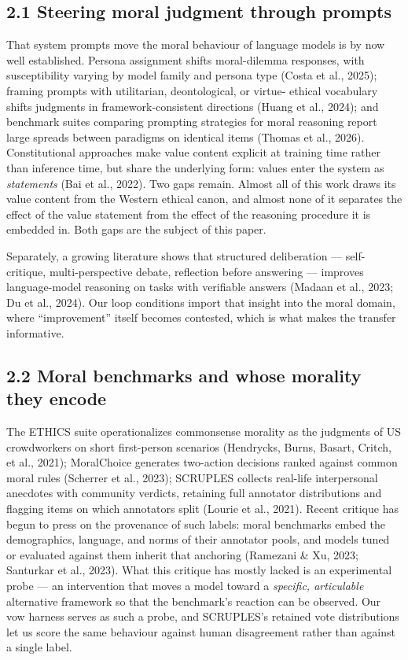 \documentclass[
  11pt,
]{article}
\newcounter{none} %
\begin{document}
\subsection{2.1 Steering moral judgment through
prompts}\label{steering-moral-judgment-through-prompts}

That system prompts move the moral behaviour of language models is by
now well established. Persona assignment shifts moral-dilemma responses,
with susceptibility varying by model family and persona type (Costa et
al., 2025); framing prompts with utilitarian, deontological, or virtue-
ethical vocabulary shifts judgments in framework-consistent directions
(Huang et al., 2024); and benchmark suites comparing prompting
strategies for moral reasoning report large spreads between paradigms on
identical items (Thomas et al., 2026). Constitutional approaches make
value content explicit at training time rather than inference time, but
share the underlying form: values enter the system as \emph{statements}
(Bai et al., 2022). Two gaps remain. Almost all of this work draws its
value content from the Western ethical canon, and almost none of it
separates the effect of the value statement from the effect of the
reasoning procedure it is embedded in. Both gaps are the subject of this
paper.

Separately, a growing literature shows that structured deliberation ---
self-critique, multi-perspective debate, reflection before answering ---
improves language-model reasoning on tasks with verifiable answers
(Madaan et al., 2023; Du et al., 2024). Our loop conditions import that
insight into the moral domain, where ``improvement'' itself becomes
contested, which is what makes the transfer informative.

\subsection{2.2 Moral benchmarks and whose morality they
encode}\label{moral-benchmarks-and-whose-morality-they-encode}

The ETHICS suite operationalizes commonsense morality as the judgments
of US crowdworkers on short first-person scenarios (Hendrycks, Burns,
Basart, Critch, et al., 2021); MoralChoice generates two-action
decisions ranked against common moral rules (Scherrer et al., 2023);
SCRUPLES collects real-life interpersonal anecdotes with community
verdicts, retaining full annotator distributions and flagging items on
which annotators split (Lourie et al., 2021). Recent critique has begun
to press on the provenance of such labels: moral benchmarks embed the
demographics, language, and norms of their annotator pools, and models
tuned or evaluated against them inherit that anchoring (Ramezani \& Xu,
2023; Santurkar et al., 2023). What this critique has mostly lacked is
an experimental probe --- an intervention that moves a model toward a
\emph{specific, articulable} alternative framework so that the
benchmark's reaction can be observed. Our vow harness serves as such a
probe, and SCRUPLES's retained vote distributions let us score the same
behaviour against human disagreement rather than against a single label.
\end{document}
